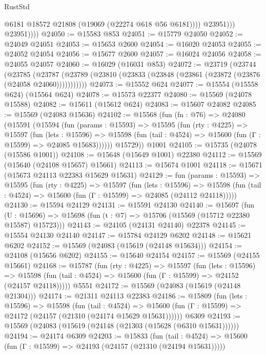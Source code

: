 \begin{lexlean}{RustStd}
\begin{coremodule}
                      @6181
                      @18572
                      @21808
                      (@19069 (@22274 @618 @56 @6181))))
                  @23951)))
            @23951))))
@24050 := @15583 @853
@24051 := @15779 @24050
@24052 := @24049 @24051
@24053 := @15653 @2600
@24054 := @16020 @24053
@24055 := @24052 @24054
@24056 := @15677 @2600
@24057 := @16024 @24056
@24058 := @24055 @24057
@24060 := @16029 (@16031 @853)
@24072 := @23719
    (@23744
      (@23785
        (@23787 (@23789 (@23810 (@23833 (@23848 (@23861 (@23872 (@23876 (@24058 @24060)))))))))))
@24073 := @15552 @624
@24077 := @15554 (@15558 @624) (@15564 @624)
@24078 := @15573 @22377
@24080 := @15569 (@24078 @15588)
@24082 := @15611 (@15612 @624)
@24083 := @15607 @24082
@24085 := @15569 (@24083 @15636)
@24102 := @15568
    (fun (fn : @76) =>
    @24080
      (@15591
        (@15594
          (fun (params : @15593) =>
          @15595
            (fun (rty : @4225) =>
            @15597
              (fun (lets : @15596) =>
              @15598 (fun (tail : @4524) => @15600 (fun (Γ : @15599) => @24085 @15683))))))
        @15729))
    @1001
@24105 := @15735 (@24078 (@15586 @1001))
@24108 := @15648 (@15649 @1001) @22380
@24112 := @15569 (@15640 (@24108 @15657) @15661)
@24113 := @15674 @1001
@24118 := @15671 (@15673 @24113 @22383 @15629 @15631)
@24129 := fun (params : @15593) =>
  @15595
    (fun (rty : @4225) =>
    @15597
      (fun (lets : @15596) =>
      @15598 (fun (tail : @4524) => @15600 (fun (Γ : @15599) => @24085 (@24112 @24118)))))
@24130 := @15594 @24129
@24131 := @15591 @24130
@24140 := @15697
    (fun (U : @15696) => @15698 (fun (t : @7) => @15706 (@15569 (@15712 @22380 @15587) @15723)))
@24143 := @24105 (@24131 @24140) @22378
@24145 := @15554 @24130 @24140
@24147 := @15784 @24129 @6202
@24148 := @15621 @6202
@24152 := @15569 (@24083 (@15619 (@24148 @15634)))
@24154 := @24108 (@15656 @6202)
@24155 := @15640 @24154
@24157 := @15569 (@24155 @15661)
@24168 := @15787
    (fun (rty : @4225) =>
    @15597
      (fun (lets : @15596) =>
      @15598 (fun (tail : @4524) => @15600 (fun (Γ : @15599) => @24152 (@24157 @24118)))))
    @5551
@24172 := @15569 (@24083 (@15619 (@24148 @21304)))
@24174 := @21311 @24113 @22383
@24186 := @15809
    (fun (lets : @15596) =>
    @15598
      (fun (tail : @4524) =>
      @15600 (fun (Γ : @15599) => @24172 (@24157 (@21310 (@24174 @15629 @15631))))))
    @6309
@24193 := @15569 (@24083 (@15619 (@24148 (@21303 (@15628 (@6310 @15631))))))
@24194 := @24174 @6309
@24203 := @15833
    (fun (tail : @4524) => @15600 (fun (Γ : @15599) => @24193 (@24157 (@21310 (@24194 @15631)))))

\end{coremodule}
\end{lexlean}
